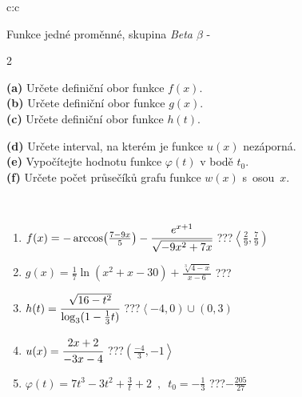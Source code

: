 \documentclass[10pt]{report}
\begin{document}
\begin{tabular}{c:c}
\begin{minipage}[c][104.5mm][t]{0.5\linewidth}
\begin{center}
\vspace{7mm}
{\huge Funkce jedné proměnné, skupina \textit{Beta $\beta$} -}\\[5mm]
\begin{minipage}{0.95\linewidth}
\begin{center}
{\small \begin{multicols}{2} \raggedright
\textbf{(a)} Určete definiční obor funkce \(f(x)\). \\[1mm]
\textbf{(b)} Určete definiční obor funkce \(g(x)\). \\[1mm]
\textbf{(c)} Určete definiční obor funkce \(h(t)\). \par \columnbreak
\textbf{(d)} Určete interval, na kterém je funkce \(u(x)\) nezáporná. \\[1mm]
\textbf{(e)} Vypočítejte hodnotu funkce \(\varphi(t)\) v bodě \(t_0\). \\[1mm]
\textbf{(f)} Určete počet průsečíků grafu funkce \(w(x)\) s~osou~\(x\). \\[1mm]
\end{multicols}
}
\end{center}
\end{minipage}
\\[4mm]
\begin{minipage}{0.79\linewidth}
\begin{center}
\begin{varwidth}{\linewidth}
\begin{enumerate}
\small
\item $f(x) = -\arccos\!\left( \frac{7-9x}{5} \right) - \cfrac{e^{x+1}}{\sqrt{-9x^2+7x}}$\quad \dotfill\; ???\;\dotfill \quad $\left\langle\frac{2}{9} , \frac{7}{9}\right)$
\item $g(x) = \frac{1}{7} \ln{\!(x^2+x-30)}+\frac{\sqrt[3]{4-x}}{x-6}$\quad \dotfill\; ???\;\dotfill {}
\item $h(t) = \cfrac{\sqrt{16-t^2}}{\log_3(1-\frac{1}{3}t)}$\quad \dotfill\; ???\;\dotfill \quad $\left\langle-4 , 0\right)\cup\left(0 , 3\right)$
\item $u(x) = \cfrac{2x+2}{-3x-4}$\quad \dotfill\; ???\;\dotfill \quad $\left(\frac{-4}{3} , -1\right\rangle$
\item $\varphi(t) = 7t^3-3t^2+\frac{3}{t}+2 \enspace , \enspace t_0=-\frac{1}{3}$\quad \dotfill\; ???\;\dotfill \quad $-\frac{205}{27}$

\end{enumerate}
\end{varwidth}
\end{center}
\end{minipage}
\end{center}
\end{minipage}
\end{tabular}
\end{document}
